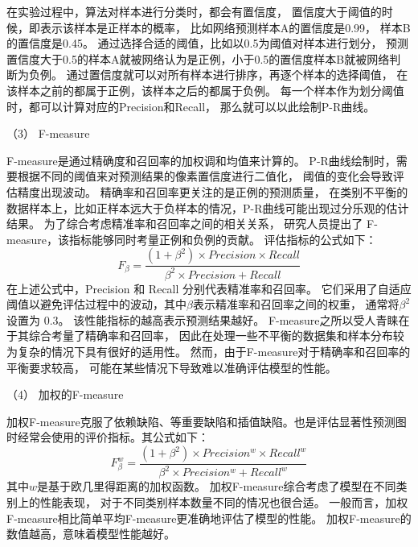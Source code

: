 在实验过程中，算法对样本进行分类时，都会有置信度，
置信度大于阈值的时候，即表示该样本是正样本的概率，
比如网络预测样本A的置信度是0.99，
样本B的置信度是0.45。
通过选择合适的阈值，比如以0.5为阈值对样本进行划分，
预测置信度大于0.5的样本A就被网络认为是正例，小于0.5的置信度样本B就被网络判断为负例。
通过置信度就可以对所有样本进行排序，再逐个样本的选择阈值，
在该样本之前的都属于正例，该样本之后的都属于负例。
每一个样本作为划分阈值时，都可以计算对应的Precision和Recall，
那么就可以以此绘制P-R曲线。






（3）
F-measure



F-measure是通过精确度和召回率的加权调和均值来计算的。
P-R曲线绘制时，需要根据不同的阈值来对预测结果的像素置信度进行二值化，
阈值的变化会导致评估精度出现波动。
精确率和召回率更关注的是正例的预测质量，
在类别不平衡的数据样本上，比如正样本远大于负样本的情况，P-R曲线可能出现过分乐观的估计结果。
为了综合考虑精准率和召回率之间的相关关系，
研究人员提出了 F-measure，该指标能够同时考量正例和负例的贡献。
评估指标的公式如下：
%
%
\begin{equation}
	F_{\beta} = \frac{\left ( 1 + \beta^{2} \right ) \times Precision \times Recall }{\beta^{2} \times Precision + Recall } 
\end{equation}
%
%
在上述公式中，Precision 和 Recall 分别代表精准率和召回率。
它们采用了自适应阈值以避免评估过程中的波动，其中$\beta$表示精准率和召回率之间的权重，
通常将$\beta^{2}$设置为 0.3。
该性能指标的越高表示预测结果越好。
F-measure之所以受人青睐在于其综合考量了精确率和召回率，
因此在处理一些不平衡的数据集和样本分布较为复杂的情况下具有很好的适用性。
然而，由于F-measure对于精确率和召回率的平衡要求较高，
可能在某些情况下导致难以准确评估模型的性能。








（4）
加权的F-measure\par
%
%
加权F-measure克服了依赖缺陷、等重要缺陷和插值缺陷。也是评估显著性预测图时经常会使用的评价指标。其公式如下：
\begin{equation}
	F_{\beta}^{w} = \frac{\left ( 1 + \beta^{2} \right ) \times Precision^{w}  \times Recall^{w} }{\beta^{2} \times Precision^{w} + Recall^{w} } 
\end{equation}
%
%
其中$w$是基于欧几里得距离的加权函数。
加权F-measure综合考虑了模型在不同类别上的性能表现，
对于不同类别样本数量不同的情况也很合适。
一般而言，加权F-measure相比简单平均F-measure更准确地评估了模型的性能。
加权F-measure的数值越高，意味着模型性能越好。





